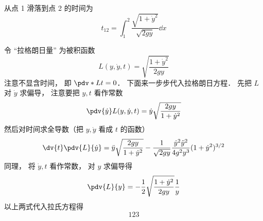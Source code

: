

从点 1 滑落到点 2 的时间为
\begin{equation}
t_{12} = \int_1^2 \frac{\sqrt{1+\dot{y}^2}}{\sqrt{2gy}} \dd{x}
\end{equation}

令 “拉格朗日量” 为被积函数
\begin{equation}
L(y, \dot{y}, t) = \sqrt{\frac{1 + \dot{y}^2}{2gy}}
\end{equation}
注意不显含时间， 即 $\pdv*{L}{t} = 0$． 下面来一步步代入拉格朗日方程． 先把 $L$ 对 $\dot{y}$ 求偏导， 注意要把 $y, t$ 看作常数
\begin{equation}
\pdv{\dot{y}}L(y, \dot{y}, t) = \dot y\sqrt{\frac{2gy}{1+\dot{y}^2}}
\end{equation}
然后对时间求全导数（把 $y, \dot{y}$ 看成 $t$ 的函数）
\begin{equation}
\dv{t}\pdv{L}{\dot{y}} = \ddot{y}\sqrt{\frac{2gy}{1+\dot{y}^2}} - \frac{1}{\sqrt{2gy}}\frac{\dot{y}^2\ddot{y}^2}{4g^2y^3}(1+\dot{y}^2)^{3/2}
\end{equation}
同理， 将 $\dot y, t$ 看作常数， 对 $y$ 求偏导得
\begin{equation}
\pdv{L}{y} = -\frac{1}{2} \sqrt{\frac{1 + \dot{y}^2}{2gy}} \frac{1}{y}
\end{equation}
以上两式代入拉氏方程得
\begin{equation}
123
\end{equation}
